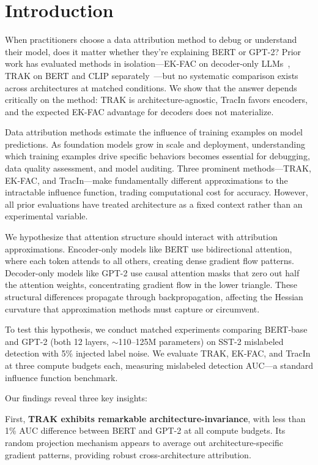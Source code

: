 \section{Introduction}

When practitioners choose a data attribution method to debug or understand their model, does it matter whether they're explaining BERT or GPT-2? Prior work has evaluated methods in isolation---EK-FAC on decoder-only LLMs~\cite{grosse2023studying}, TRAK on BERT and CLIP separately~\cite{park2023trak}---but no systematic comparison exists across architectures at matched conditions. We show that the answer depends critically on the method: TRAK is architecture-agnostic, TracIn favors encoders, and the expected EK-FAC advantage for decoders does not materialize.

Data attribution methods estimate the influence of training examples on model predictions. As foundation models grow in scale and deployment, understanding which training examples drive specific behaviors becomes essential for debugging, data quality assessment, and model auditing. Three prominent methods---TRAK, EK-FAC, and TracIn---make fundamentally different approximations to the intractable influence function, trading computational cost for accuracy. However, all prior evaluations have treated architecture as a fixed context rather than an experimental variable.

We hypothesize that attention structure should interact with attribution approximations. Encoder-only models like BERT use bidirectional attention, where each token attends to all others, creating dense gradient flow patterns. Decoder-only models like GPT-2 use causal attention masks that zero out half the attention weights, concentrating gradient flow in the lower triangle. These structural differences propagate through backpropagation, affecting the Hessian curvature that approximation methods must capture or circumvent.

To test this hypothesis, we conduct matched experiments comparing BERT-base and GPT-2 (both 12 layers, $\sim$110--125M parameters) on SST-2 mislabeled detection with 5\% injected label noise. We evaluate TRAK, EK-FAC, and TracIn at three compute budgets each, measuring mislabeled detection AUC---a standard influence function benchmark.

Our findings reveal three key insights:

First, \textbf{TRAK exhibits remarkable architecture-invariance}, with less than 1\% AUC difference between BERT and GPT-2 at all compute budgets. Its random projection mechanism appears to average out architecture-specific gradient patterns, providing robust cross-architecture attribution.

